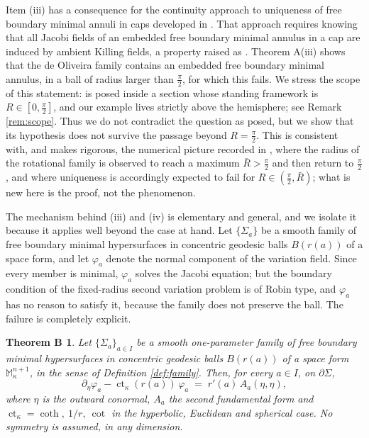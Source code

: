 \documentclass[11pt,a4paper]{amsart}
\theoremstyle{plain}
\newtheorem*{thmB}{Theorem B}
\theoremstyle{definition}
\newcommand{\M}{\mathbb{M}}
\newcommand{\ct}{\operatorname{ct}_\kappa}
\begin{document}
Item (iii) has a consequence for the continuity approach to uniqueness of free boundary minimal annuli in caps developed in \cite[\S 6]{NZ1}. That approach requires knowing that all Jacobi fields of an embedded free boundary minimal annulus in a cap are induced by ambient Killing fields, a property raised as \cite[Question 6.6]{NZ1}. Theorem A(iii) shows that the de Oliveira family contains an embedded free boundary minimal annulus, in a ball of radius larger than $\tfrac\pi2$, for which this fails. We stress the scope of this statement: \cite[Question 6.6]{NZ1} is posed inside a section whose standing framework is $R\in[0,\tfrac\pi2]$, and our example lives strictly above the hemisphere; see Remark \ref{rem:scope}. Thus we do not contradict the question as posed, but we show that its hypothesis does not survive the passage beyond $R=\tfrac\pi2$. This is consistent with, and makes rigorous, the numerical picture recorded in \cite[Rem. 1.3]{NZ1}, where the radius of the rotational family is observed to reach a maximum $\bar R>\tfrac\pi2$ and then return to $\tfrac\pi2$, and where uniqueness is accordingly expected to fail for $R\in(\tfrac\pi2,\bar R)$; what is new here is the proof, not the phenomenon.

The mechanism behind (iii) and (iv) is elementary and general, and we isolate it because it applies well beyond the case at hand. Let $\{\Sigma_a\}$ be a smooth family of free boundary minimal hypersurfaces in concentric geodesic balls $B(r(a))$ of a space form, and let $\varphi_a$ denote the normal component of the variation field. Since every member is minimal, $\varphi_a$ solves the Jacobi equation; but the boundary condition of the fixed-radius second variation problem is of Robin type, and $\varphi_a$ has no reason to satisfy it, because the family does not preserve the ball. The failure is completely explicit.

\begin{thmB}
Let $\{\Sigma_a\}_{a\in I}$ be a smooth one-parameter family of free boundary minimal hypersurfaces in concentric geodesic balls $B(r(a))$ of a space form $\M^{n+1}_\kappa$, in the sense of Definition \textup{\ref{def:family}}. Then, for every $a\in I$, on $\partial\Sigma$,
\[
\partial_\eta\varphi_a-\ct(r(a))\,\varphi_a\;=\;r'(a)\,A_a(\eta,\eta),
\]
where $\eta$ is the outward conormal, $A_a$ the second fundamental form and $\ct=\coth,\ 1/r,\ \cot$ in the hyperbolic, Euclidean and spherical case. No symmetry is assumed, in any dimension.
\end{thmB}
\end{document}
